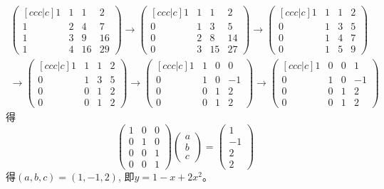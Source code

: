 \begin{multline*}
\begin{pmatrix}[ccc|c] 1 & 1 & 1 & 2 \\ 1 & 2 & 4 & 7 \\ 1 & 3 & 9 & 16 \\ 1 & 4 & 16 & 29 \end{pmatrix}
\longrightarrow \begin{pmatrix}[ccc|c] 1 & 1 & 1 & 2 \\ 0 & 1 & 3 & 5 \\ 0 & 2 & 8 & 14 \\ 0 & 3 & 15 & 27 \end{pmatrix}
\longrightarrow \begin{pmatrix}[ccc|c] 1 & 1 & 1 & 2 \\ 0 & 1 & 3 & 5 \\ 0 & 1 & 4 & 7 \\ 0 & 1 & 5 & 9 \end{pmatrix} \\
\longrightarrow \begin{pmatrix}[ccc|c] 1 & 1 & 1 & 2 \\ 0 & 1 & 3 & 5 \\ 0 & 0 & 1 & 2 \\ 0 & 0 & 1 & 2 \end{pmatrix}
\longrightarrow \begin{pmatrix}[ccc|c] 1 & 1 & 0 & 0 \\ 0 & 1 & 0 & -1 \\ 0 & 0 & 1 & 2 \\ 0 & 0 & 1 & 2 \end{pmatrix}
\longrightarrow \begin{pmatrix}[ccc|c] 1 & 0 & 0 & 1 \\ 0 & 1 & 0 & -1 \\ 0 & 0 & 1 & 2 \\ 0 & 0 & 1 & 2 \end{pmatrix}
\end{multline*}
得
$$\begin{pmatrix} 1 & 0 & 0 \\ 0 & 1 & 0 \\ 0 & 0 & 1 \\ 0 & 0 & 1 \end{pmatrix} \begin{pmatrix} a \\ b \\ c \end{pmatrix} = \begin{pmatrix} 1 \\ -1 \\ 2 \\ 2 \end{pmatrix}$$
得$(a,b,c) = (1,-1,2)$, 即$y = 1 - x + 2x^2$。


